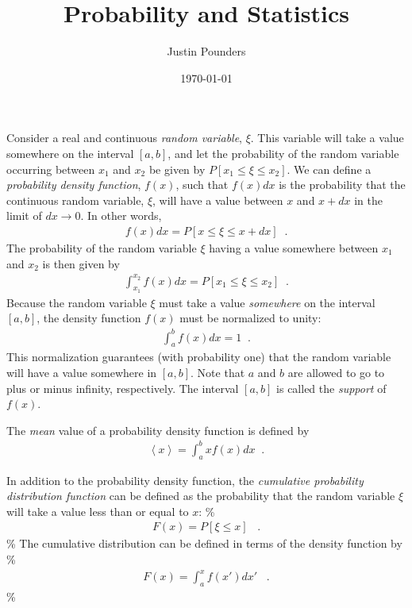 \documentclass[11pt]{article}
\author{Justin Pounders}
\date{\today}
\title{Probability and Statistics}
\begin{document}
\maketitle
\tableofcontents

Consider a real and continuous \emph{random variable}, \(\xi\).  This variable will take a value somewhere on the interval \([a,b]\), and let the probability of the random variable occurring between \(x_1\) and \(x_2\) be given by \(P\left[ x_1 \leq \xi \leq x_2 \right]\).  We can define a \emph{probability density function}, \(f(x)\), such that \(f(x)dx\) is the probability that the continuous random variable, \(\xi\), will have a value between \(x\) and \(x+dx\) in the limit of \(dx \rightarrow 0\).  In other words,
\begin{align}
  \label{eq::probDensFuncDef}
  f(x)dx = P\left[ x \leq \xi \leq x+dx \right] \;\;.
\end{align}
The probability of the random variable \(\xi\) having a value somewhere between \(x_1\) and \(x_2\) is then given by
\begin{align}
  \int_{x_1}^{x_2} f(x) dx = P\left[ x_1 \leq \xi \leq x_2 \right] \;\;.
\end{align}
Because the random variable \(\xi\) must take a value \emph{somewhere} on the interval \([a,b]\), the density function \(f(x)\) must be normalized to unity:
\begin{align}
  \int_a^b f(x) dx = 1 \;\;.
\end{align}
This normalization guarantees (with probability one) that the random variable will have a value somewhere in \([a,b]\).  Note that \(a\) and \(b\) are allowed to go to plus or minus infinity, respectively.  The interval \([a,b]\) is called the \emph{support} of \(f(x)\).

The \emph{mean} value of a probability density function is defined by
\begin{align}
  \left< x \right> = \int_a^b x f(x) dx \;\;.
\end{align}

In addition to the probability density function, the \emph{cumulative probability distribution function} can be defined as the probability that the random variable \(\xi\) will take a value less than or equal to \(x\):
\%
\begin{align}
  F(x) = P\left[ \xi \leq x \right] \;\;\; .
\end{align}
\%
The cumulative distribution can be defined in terms of the density function by
\%
\begin{align}
  F(x) = \int_a^x f(x') dx' \;\;\; .
\end{align}
\%
\end{document}
